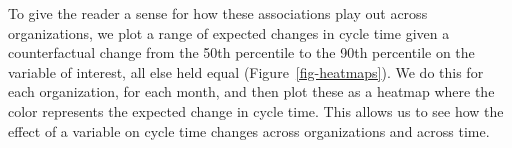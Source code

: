 \documentclass[manuscript,screen,review]{acmart}
\begin{document}
To give the reader a sense for how these associations play out across
organizations, we plot a range of expected changes in cycle time given a
counterfactual change from the 50th percentile to the 90th percentile on
the variable of interest, all else held equal
(Figure~\ref{fig-heatmaps}). We do this for each organization, for each
month, and then plot these as a heatmap where the color represents the
expected change in cycle time. This allows us to see how the effect of a
variable on cycle time changes across organizations and across time.

\begin{figure}

\begin{minipage}{0.33\linewidth}



\end{minipage}%
%
\begin{minipage}{0.33\linewidth}

\end{minipage}
\end{figure}
\end{document}
